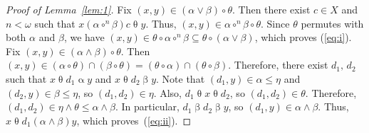 \documentclass[11pt,reqno]{amsart}
\theoremstyle{plain}
\theoremstyle{definition}
\theoremstyle{remark}
\newcommand{\<}{\ensuremath{\langle}}
\renewcommand{\>}{\ensuremath{\rangle}}
\newcommand{\rel}[1]{\ensuremath{\mathbin{#1}}}
\renewcommand{\leq}{\ensuremath{\leqslant}}
\newcommand{\meet}{\ensuremath{\wedge}}
\newcommand{\join}{\ensuremath{\vee}}
\begin{document}
\begin{proof}[Proof of Lemma~\ref{lem:1}]
Fix $(x,y) \in (\alpha \join \beta) \circ \theta$.  Then there exist $c \in X$
and $n< \omega$ such that $x \rel{(\alpha \circ^{n}\beta)} c \rel{\theta} y$.
Thus, $(x,y) \in \alpha \circ^{n}\beta \circ \theta$.  Since $\theta$ permutes
with both $\alpha$ and $\beta$, we have $(x,y) \in \theta \circ \alpha
\circ^{n}\beta \subseteq \theta \circ (\alpha \join \beta)$, which proves
(\ref{eq:i}).
Fix $(x,y) \in (\alpha \meet \beta) \circ \theta$.  Then 
$(x,y) \in (\alpha \circ \theta) \cap (\beta \circ \theta) = 
(\theta \circ \alpha ) \cap (\theta \circ \beta)$.  Therefore, there exist $d_1,
\,d_2$ such that 
$x \rel{\theta} d_1 \rel{\alpha} y$ and 
$x \rel{\theta} d_2 \rel{\beta} y$.  Note that $(d_1, y) \in \alpha \leq \eta$ and 
$(d_2, y) \in \beta \leq \eta$, so $(d_1, d_2) \in \eta$.  Also, $d_1
\rel{\theta} x \rel{\theta} d_2$, so $(d_1, d_2) \in \theta$.  Therefore, 
$(d_1, d_2) \in \eta \meet \theta \leq \alpha \meet \beta$.
In particular, 
$d_1 \rel{\beta} d_2 \rel{\beta} y$, so
$(d_1,y)\in \alpha \meet \beta$.
% 
Thus, $x\rel{\theta} d_1 \rel{(\alpha\meet \beta)} y$, which proves~(\ref{eq:ii}).

\end{proof}



%

\end{document}
